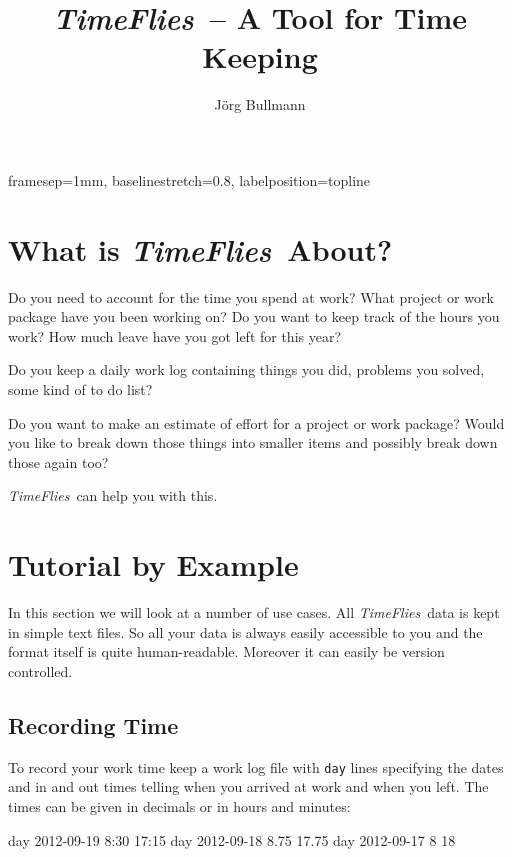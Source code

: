 \documentclass[11pt]{article}
\newcommand{\timeflies}{\emph{TimeFlies}}
\begin{document}
   {%
    framesep=1mm,
    baselinestretch=0.8,
    labelposition=topline}


\title{\timeflies\ -- A Tool for Time Keeping}
\author{J\"org Bullmann}
\maketitle
\tableofcontents
\newpage

\section{What is \timeflies\ About?}

Do you need to account for the time you spend at work? What project or work package have you been working on? Do you want to keep track of the hours you work? How much leave have you got left for this year?

Do you keep a daily work log containing things you did, problems you solved, some kind of to do list?

Do you want to make an estimate of effort for a project or work package? Would you like to break down those things into smaller items and possibly break down those again too?

\timeflies\ can help you with this.

\section{Tutorial by Example}

In this section we will look at a number of use cases. All \timeflies\ data is kept in simple text files. So all your data is always easily accessible to you and the format itself is quite human-readable. Moreover it can easily be version controlled.

\subsection{Recording Time}

To record your work time keep a work log file with \verb-day- lines specifying the dates and in and out times telling when you arrived at work and when you left. The times can be given in decimals or in hours and minutes:

\begin{inputfile}
day 2012-09-19 8:30 17:15
day 2012-09-18 8.75 17.75
day 2012-09-17 8 18
\end{inputfile}
\end{document}
